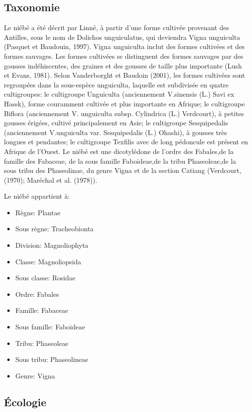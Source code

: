 \documentclass[a4paper,11pt]{article}
\begin{document}
\subsection{Taxonomie}

Le niébé a été décrit par Linné, à partir d’une forme cultivée
provenant des Antilles, sous le nom de Dolichos unguiculatus, qui
deviendra Vigna unguiculta (Pasquet et Baudouin, 1997). Vigna
unguiculta inclut des formes cultivées et des formes sauvages. Les
formes cultivées se distinguent des formes sauvages par des gousses
indéhiscentes, des graines et des gousses de taille plus importante
(Lush et Evans, 1981). Selon Vanderborght et Baudoin (2001), les
formes cultivées sont regroupées dans la sous-espèce unguiculta,
laquelle est subdivisée en quatre cultigroupes: le cultigroupe
Unguiculta (anciennement V.sinensis (L.) Savi ex Hassk), forme
couramment cultivée et plus importante en Afrique; le cultigroupe
Biflora (anciennement V. unguiculta subsp. Cylindrica (L.) Verdcourt),
à petites gousses érigées, cultivé principalement en Asie; le
cultigroupe Sesquipedalis (anciennement V.unguiculta
var. Sesquipedalis (L.) Ohashi), à gousses très longues et pendantes;
le cultigroupe Texfilis avec de long pédoncule est présent en Afrique de l’Ouest. Le
niébé est une dicotylédone de l’ordre des Fabales,de la famille des Fabaceae,
de la sous famille Faboideae,de la tribu Phaseoleae,de la sous tribu des Phaseolinae,
du genre Vigna et de la section Catiang (Verdcourt, (1970); Maréchal et al. (1978))\cite{Sawadogo_2009}.

Le niébé appartient à:
\begin{itemize} 
\item Règne: Plantae
\item Sous règne: Tracheobionta
\item Division: Magnoliophyta
\item Classe: Magnoliopsida
\item Sous classe: Rosidae
\item Ordre: Fabales
\item Famille: Fabaceae
\item Sous famille: Faboideae
\item Tribu: Phaseoleae
\item Sous tribu: Phaseolineae
\item Genre: Vigna
\end{itemize}

\subsection{Écologie}
\end{document}
